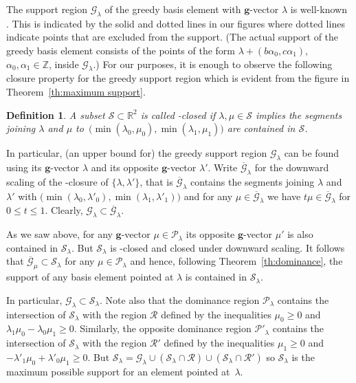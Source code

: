 \documentclass[pdflatex,sn-mathphys]{sn-jnl}%
\theoremstyle{thmstyleone}%
\theoremstyle{thmstyletwo}%
\theoremstyle{thmstylethree}%
\newtheorem{definition}[theorem]{Definition}
\newcommand{\bfg}{\boldsymbol{g}}
\newcommand{\cG}{\mathcal{G}}
\newcommand{\cP}{\mathcal{P}}
\newcommand{\cR}{\mathcal{R}}
\newcommand{\cS}{\mathcal{S}}
\newcommand{\RR}{\mathbb{R}}
\newcommand{\ZZ}{\mathbb{Z}}
\begin{document}
  The support region $\cG_\lambda$ of the greedy basis element with $\bfg$-vector $\lambda$ is well-known \cite{CGMMRSW17,LLZ14}.
  This is indicated by the solid and dotted lines in our figures where dotted lines indicate points that are excluded from the support.
  (The actual support of the greedy basis element consists of the points of the form $\lambda+(b \alpha_0 ,c \alpha_1)$, $\alpha_0,\alpha_1\in\ZZ$, inside $\cG_\lambda$.)
  For our purposes, it is enough to observe the following closure property for the greedy support region which is evident from the figure in Theorem~\ref{th:maximum support}.
  \begin{definition}
    A subset $\cS\subset\RR^2$ is called \scalebox{1.7}{$\llcorner$}-closed if $\lambda,\mu\in\cS$ implies the segments joining $\lambda$ and $\mu$ to~$\big(\!\min(\lambda_0,\mu_0),\min(\lambda_1,\mu_1)\big)$ are contained in $\cS$.
  \end{definition}
  In particular, (an upper bound for) the greedy support region $\cG_\lambda$ can be found using its $\bfg$-vector $\lambda$ %
  and its opposite $\bfg$-vector $\lambda'$. %
  Write $\overline{\cG}_\lambda$ for the downward scaling of the \scalebox{1.7}{$\llcorner$}-closure of $\{\lambda,\lambda'\}$, that is $\overline{\cG}_\lambda$ contains the segments joining $\lambda$ and $\lambda'$ with $\big(\!\min(\lambda_0,\lambda'_0),\min(\lambda_1,\lambda'_1)\big)$ and for any $\mu\in\overline{\cG}_\lambda$ we have $t\mu\in\overline{\cG}_\lambda$ for $0\le t\le 1$.
  Clearly, $\cG_\lambda\subset\overline{\cG}_\lambda$.

  As we saw above, for any $\bfg$-vector $\mu\in\cP_\lambda$ its opposite $\bfg$-vector $\mu'$ is also contained in $\cS_\lambda$.
  But $\cS_\lambda$ is \scalebox{1.7}{$\llcorner$}-closed and closed under downward scaling. %
  It follows that $\overline{\cG}_\mu\subset\cS_\lambda$ for any $\mu\in\cP_\lambda$ and hence, following Theorem~\ref{th:dominance}, the support of any basis element pointed at $\lambda$ is contained in $\cS_\lambda$.

  In particular, $\cG_\lambda\subset\cS_\lambda$.
  Note also that the dominance region $\cP_\lambda$ contains the intersection of $\cS_\lambda$ with the region $\cR$ defined by the inequalities $\mu_0\ge0$ and $\lambda_1\mu_0-\lambda_0\mu_1\ge0$.
  Similarly, the opposite dominance region $\cP'_\lambda$ contains the intersection of $\cS_\lambda$ with the region $\cR'$ defined by the inequalities $\mu_1\ge0$ and $-\lambda'_1\mu_0+\lambda'_0\mu_1\ge0$.
  But $\cS_\lambda=\cG_\lambda\cup(\cS_\lambda\cap\cR)\cup(\cS_\lambda\cap\cR')$ so $\cS_\lambda$ is the maximum possible support for an element pointed at~$\lambda$.
\end{document}
